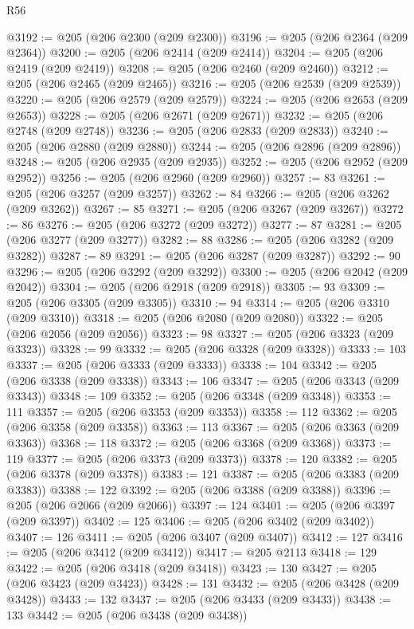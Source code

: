 \begin{lexlean}{R56}
\begin{coremodule}
@3192 := @205 (@206 @2300 (@209 @2300))
@3196 := @205 (@206 @2364 (@209 @2364))
@3200 := @205 (@206 @2414 (@209 @2414))
@3204 := @205 (@206 @2419 (@209 @2419))
@3208 := @205 (@206 @2460 (@209 @2460))
@3212 := @205 (@206 @2465 (@209 @2465))
@3216 := @205 (@206 @2539 (@209 @2539))
@3220 := @205 (@206 @2579 (@209 @2579))
@3224 := @205 (@206 @2653 (@209 @2653))
@3228 := @205 (@206 @2671 (@209 @2671))
@3232 := @205 (@206 @2748 (@209 @2748))
@3236 := @205 (@206 @2833 (@209 @2833))
@3240 := @205 (@206 @2880 (@209 @2880))
@3244 := @205 (@206 @2896 (@209 @2896))
@3248 := @205 (@206 @2935 (@209 @2935))
@3252 := @205 (@206 @2952 (@209 @2952))
@3256 := @205 (@206 @2960 (@209 @2960))
@3257 := 83
@3261 := @205 (@206 @3257 (@209 @3257))
@3262 := 84
@3266 := @205 (@206 @3262 (@209 @3262))
@3267 := 85
@3271 := @205 (@206 @3267 (@209 @3267))
@3272 := 86
@3276 := @205 (@206 @3272 (@209 @3272))
@3277 := 87
@3281 := @205 (@206 @3277 (@209 @3277))
@3282 := 88
@3286 := @205 (@206 @3282 (@209 @3282))
@3287 := 89
@3291 := @205 (@206 @3287 (@209 @3287))
@3292 := 90
@3296 := @205 (@206 @3292 (@209 @3292))
@3300 := @205 (@206 @2042 (@209 @2042))
@3304 := @205 (@206 @2918 (@209 @2918))
@3305 := 93
@3309 := @205 (@206 @3305 (@209 @3305))
@3310 := 94
@3314 := @205 (@206 @3310 (@209 @3310))
@3318 := @205 (@206 @2080 (@209 @2080))
@3322 := @205 (@206 @2056 (@209 @2056))
@3323 := 98
@3327 := @205 (@206 @3323 (@209 @3323))
@3328 := 99
@3332 := @205 (@206 @3328 (@209 @3328))
@3333 := 103
@3337 := @205 (@206 @3333 (@209 @3333))
@3338 := 104
@3342 := @205 (@206 @3338 (@209 @3338))
@3343 := 106
@3347 := @205 (@206 @3343 (@209 @3343))
@3348 := 109
@3352 := @205 (@206 @3348 (@209 @3348))
@3353 := 111
@3357 := @205 (@206 @3353 (@209 @3353))
@3358 := 112
@3362 := @205 (@206 @3358 (@209 @3358))
@3363 := 113
@3367 := @205 (@206 @3363 (@209 @3363))
@3368 := 118
@3372 := @205 (@206 @3368 (@209 @3368))
@3373 := 119
@3377 := @205 (@206 @3373 (@209 @3373))
@3378 := 120
@3382 := @205 (@206 @3378 (@209 @3378))
@3383 := 121
@3387 := @205 (@206 @3383 (@209 @3383))
@3388 := 122
@3392 := @205 (@206 @3388 (@209 @3388))
@3396 := @205 (@206 @2066 (@209 @2066))
@3397 := 124
@3401 := @205 (@206 @3397 (@209 @3397))
@3402 := 125
@3406 := @205 (@206 @3402 (@209 @3402))
@3407 := 126
@3411 := @205 (@206 @3407 (@209 @3407))
@3412 := 127
@3416 := @205 (@206 @3412 (@209 @3412))
@3417 := @205 @2113
@3418 := 129
@3422 := @205 (@206 @3418 (@209 @3418))
@3423 := 130
@3427 := @205 (@206 @3423 (@209 @3423))
@3428 := 131
@3432 := @205 (@206 @3428 (@209 @3428))
@3433 := 132
@3437 := @205 (@206 @3433 (@209 @3433))
@3438 := 133
@3442 := @205 (@206 @3438 (@209 @3438))

\end{coremodule}
\end{lexlean}
